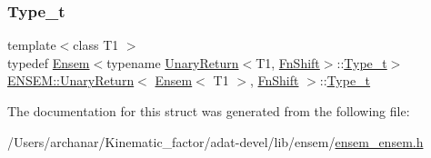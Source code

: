 \mbox{\label{structENSEM_1_1UnaryReturn_3_01Ensem_3_01T1_01_4_00_01FnShift_01_4_aed1937a9071e7b8f1a036bdb1860c54d}} 
\subsubsection{\texorpdfstring{Type\_t}{Type\_t}\hspace{0.1cm}{\footnotesize\ttfamily [3/3]}}
{\footnotesize\ttfamily template$<$class T1 $>$ \\
typedef \mbox{\hyperlink{classENSEM_1_1Ensem}{Ensem}}$<$typename \mbox{\hyperlink{structENSEM_1_1UnaryReturn}{Unary\+Return}}$<$T1, \mbox{\hyperlink{structENSEM_1_1FnShift}{Fn\+Shift}}$>$\+::\mbox{\hyperlink{structENSEM_1_1UnaryReturn_3_01Ensem_3_01T1_01_4_00_01FnShift_01_4_aed1937a9071e7b8f1a036bdb1860c54d}{Type\+\_\+t}}$>$ \mbox{\hyperlink{structENSEM_1_1UnaryReturn}{E\+N\+S\+E\+M\+::\+Unary\+Return}}$<$ \mbox{\hyperlink{classENSEM_1_1Ensem}{Ensem}}$<$ T1 $>$, \mbox{\hyperlink{structENSEM_1_1FnShift}{Fn\+Shift}} $>$\+::\mbox{\hyperlink{structENSEM_1_1UnaryReturn_3_01Ensem_3_01T1_01_4_00_01FnShift_01_4_aed1937a9071e7b8f1a036bdb1860c54d}{Type\+\_\+t}}}



The documentation for this struct was generated from the following file\+:\begin{DoxyCompactItemize}
\item 
/\+Users/archanar/\+Kinematic\+\_\+factor/adat-\/devel/lib/ensem/\mbox{\hyperlink{adat-devel_2lib_2ensem_2ensem__ensem_8h}{ensem\+\_\+ensem.\+h}}\end{DoxyCompactItemize}
